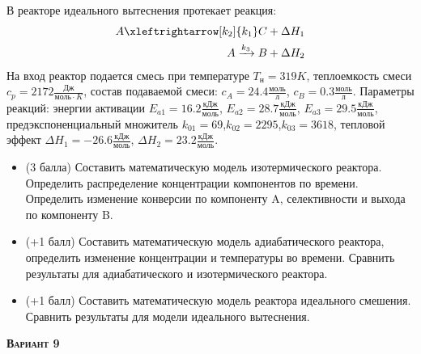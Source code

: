  В реакторе идеального вытеснения протекает реакция: \begin{equation*} \begin{aligned} A \xleftrightarrow[k_2]{k_1} C + \Delta H_1 \\ A \xrightarrow{k_3} B + \Delta H_2 \end{aligned} \end{equation*}                                      На вход  реактор подается смесь при температуре $ T_н =  319 K$, теплоемкость смеси $c_p= 2172 \frac{Дж}{моль \cdot K}$, состав подаваемой смеси: $c_A=24.4 \frac{моль}{л}$, $c_B=0.3 \frac{моль}{л}$. Параметры реакций: энергии активации $E_{a1}=16.2 \frac{кДж}{моль}$, $E_{a2}=28.7  \frac{кДж}{моль}$, $E_{a3}=29.5  \frac{кДж}{моль}$, предэкспоненциальный множитель $k_{01}=        69$,$k_{02}=      2295$,$k_{03}=      3618$, тепловой эффект $\Delta H_1= -26.6  \frac{кДж}{моль}$, $\Delta H_2=23.2 \frac{кДж}{моль}$.\begin{itemize} \item (3 балла) Составить математическую модель изотермического реактора. Определить распределение концентрации компонентов по времени. Определить изменение конверсии по компоненту A, селективности и выхода по компоненту B. \item (+1 балл) Составить математическую модель адиабатического реактора, определить изменение концентрации и температуры во времени. Сравнить результаты для адиабатического и изотермического реактора. \item (+1 балл) Составить математическую модель реактора идеального смешения. Сравнить результаты для модели идеального вытеснения. \end{itemize}

\textsc{\textbf{Вариант 9}}

